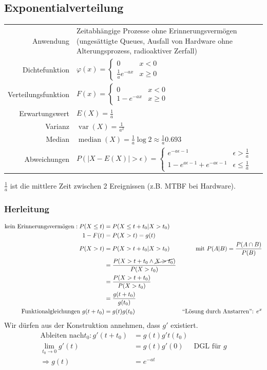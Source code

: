 \documentclass[10pt,a4paper]{scrartcl}
\newif\ifincludeDerivations
\DeclareMathOperator{\var}{var}
\DeclareMathOperator{\median}{median}
\begin{document}
\subsection{Exponentialverteilung}
\begin{tabular}{r p{\katalogSpaltezwei}}
Anwendung & Zeitabhängige Prozesse ohne Erinnerungsvermögen (ungesättigte Queues, 
            Ausfall von Hardware ohne Alterungsprozess, radioaktiver Zerfall) \\
Dichtefunktion & $\varphi(x) = \begin{cases} 0 & x < 0 \\ \frac{1}{a}e^{-ax} & x \ge 0 \end{cases} $ \\
Verteilungsfunktion & $F(x) = \begin{cases} 0 & x<0 \\ 1 - e^{-ax} & x \ge 0 \end{cases} $ \\
Erwartungswert & $E(X) = \frac{1}{a} $ \\
Varianz & $\var(X) = \frac{1}{a^2} $ \\
Median & $ \median(X) = \frac{1}{a} \log 2 \approx \frac{1}{a} 0.693 $ \\
Abweichungen & $P(|X - E(X)| > \epsilon) = \begin{cases} e^{-a\epsilon-1} & \epsilon > \frac{1}{a} \\ 1 - e^{a\epsilon-1} + e^{-a\epsilon-1} & \epsilon \le \frac{1}{a}\end{cases}$ 
\end{tabular} 

$\frac{1}{a}$ ist die mittlere Zeit zwischen 2 Ereignissen (z.B. MTBF bei Hardware).

\ifincludeDerivations
\subsubsection{Herleitung}
\begin{align*}
\text{kein Erinnerungsvermögen}: P(X\le t) & = P(X \le t + t_0 | X > t_0) \\ 
1 - F(t) & = P(X>t) = g(t) \\
P(X>t) & = P(X > t+t_0 | X > t_0) & \text{mit } P(A|B) = \frac{P(A\cap B)}{P(B)}\\ 
 & =  \frac{P(X > t+t_0 \wedge \cancel{X > t_0})}{P(X>t_0)} \\ 
 & = \frac{P(X > t+t_0)}{P(X>t_0)} \\
 & = \frac{g(t+t_0)}{g(t_0)} \\
 \text{Funktionalgleichungen } g(t+t_0) & = g(t)g(t_0) & \text{``Lösung durch Anstarren'': } e^x\\
\end{align*}
Wir dürfen aus der Konstruktion annehmen, dass $g'$ existiert.
\begin{align*}
\text{Ableiten nach} t_0: g'(t+t_0) & = g(t)g't(t_0) \\
\lim_{t_0 \to 0} g'(t) & = g(t)g'(0) & \text{DGL für } g \\
\Rightarrow g(t) & = e^{-at} 
\end{align*}
\end{document}
